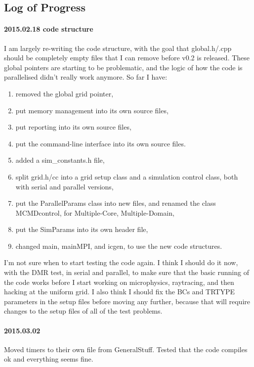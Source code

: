 \documentclass[a4paper,11pt]{article}
\begin{document}
\subsection{Log of Progress}

\paragraph{2015.02.18 code structure}
I am largely re-writing the code structure, with the goal that global.h/.cpp should be completely empty files that I can remove before v0.2 is released.
These global pointers are starting to be problematic, and the logic of how the code is parallelised didn't really work anymore.
So far I have:
\begin{enumerate}
\item removed the global grid pointer,
\item put memory management into its own source files, 
\item put reporting into its own source files,
\item put the command-line interface into its own source files.
\item added a sim\_constants.h file,
\item split grid.h/cc into a grid setup class and a simulation control class, both with serial and parallel versions,
\item put the ParallelParams class into new files, and renamed the class MCMDcontrol, for Multiple-Core, Multiple-Domain,
\item put the SimParams into its own header file,
\item changed main, mainMPI, and icgen, to use the new code structures.
\end{enumerate}

I'm not sure when to start testing the code again.
I think I should do it now, with the DMR test, in serial and parallel, to make sure that the basic running of the code works before I start working on microphysics, raytracing, and then hacking at the uniform grid.
I also think I should fix the BCs and TRTYPE parameters in the setup files before moving any further, because that will require changes to the setup files of all of the test problems.

\paragraph{2015.03.02}
Moved timers to their own file from GeneralStuff.
Tested that the code compiles ok and everything seems fine.
\end{document}
